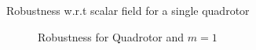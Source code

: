\documentclass{beamer}
\begin{document}
\begin{frame}{Robustness w.r.t scalar field for a single quadrotor}	
	\begin{figure}[t]
		
		\caption{Robustness for Quadrotor and $m=1$}
		\centering
		\label{fig:quadrotor_robustness}
	\end{figure}
\end{frame}
%		
\end{document}
